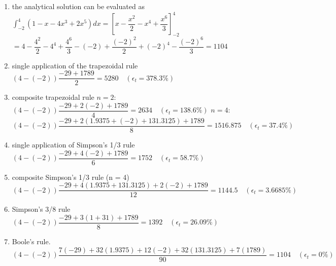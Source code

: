 \documentclass[../main.tex]{subfiles}
\begin{document}
\section{}
\begin{enumerate}[label=\bfseries(\alph*)]
\item the analytical solution can be evaluated as
	\bigbreak
$\displaystyle\int_{-2}^{4} \left(1-x-4 x^{3}+2 x^{5}\right) d x=\left[x-\dfrac{x^{2}}{2}-x^{4}+\dfrac{x^{6}}{3}\right]_{-2}^{4}$
	\bigbreak
$=4-\dfrac{4^{2}}{2}-4^{4}+\dfrac{4^{6}}{3}-(-2)+\dfrac{(-2)^{2}}{2}+(-2)^{4}-\dfrac{(-2)^{6}}{3}=1104$
	\bigbreak
\item single application of the trapezoidal rule
	\bigbreak
$(4-(-2)) \dfrac{-29+1789}{2}=5280 \quad\left(\epsilon_{t}=378.3 \%\right)$
	\bigbreak

\item composite trapezoidal rule
	\bigbreak
$n=2:$
	\bigbreak
$(4-(-2)) \dfrac{-29+2(-2)+1789}{4}=2634 \quad\left(\epsilon_{t}=138.6 \%\right)$
	\bigbreak
$n=4:$
	\bigbreak
$(4-(-2)) \dfrac{-29+2(1.9375+(-2)+131.3125)+1789}{8}=1516.875 \quad\left(\epsilon_{t}=37.4 \%\right)$
	\bigbreak

\item single application of Simpson’s 1/3 rule
	\bigbreak
$(4-(-2)) \dfrac{-29+4(-2)+1789}{6}=1752 \quad\left(\epsilon_{t}=58.7 \%\right)$
	\bigbreak

\item composite Simpson’s 1/3 rule (n = 4)
	\bigbreak
$(4-(-2)) \dfrac{-29+4(1.9375+131.3125)+2(-2)+1789}{12}=1144.5 \quad\left(\epsilon_{t}=3.6685 \%\right)$
	\bigbreak

\item Simpson’s 3/8 rule
	\bigbreak
$(4-(-2)) \dfrac{-29+3(1+31)+1789}{8}=1392 \quad\left(\epsilon_{t}=26.09 \%\right)$
	\bigbreak

\item Boole's rule.
	\bigbreak
$(4-(-2)) \dfrac{7(-29)+32(1.9375)+12(-2)+32(131.3125)+7(1789)}{90}=1104 \quad\left(\epsilon_{t}=0 \%\right)$
	\bigbreak 
\end{enumerate}
\end{document}
